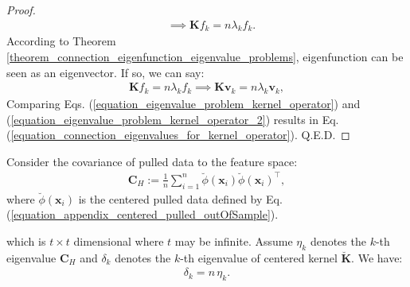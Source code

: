 \documentclass[lang=cn,10pt]{gorgeousnbook}
\numberwithin{equation}{section}%
\numberwithin{figure}{section}%
\begin{document}
\begin{proof}
\begin{align*}
&\implies \boldsymbol{K} f_k = n \lambda_k f_k.
\end{align*}
According to Theorem \ref{theorem_connection_eigenfunction_eigenvalue_problems}, eigenfunction can be seen as an eigenvector. If so, we can say:
\begin{align}\label{equation_eigenvalue_problem_kernel_operator_2}
\boldsymbol{K} f_k = n \lambda_k f_k \implies \boldsymbol{K} \boldsymbol{v}_k = n \lambda_k \boldsymbol{v}_k,
\end{align}
Comparing Eqs. (\ref{equation_eigenvalue_problem_kernel_operator}) and (\ref{equation_eigenvalue_problem_kernel_operator_2}) results in Eq. (\ref{equation_connection_eigenvalues_for_kernel_operator}). Q.E.D.
\end{proof}

\begin{lemma}
Consider the covariance of pulled data to the feature space:
\begin{align}\label{equation_covariance_in_feature_space}
\boldsymbol{C}_H := \frac{1}{n} \sum_{i=1}^n \breve{\phi}(\boldsymbol{x}_i) \breve{\phi}(\boldsymbol{x}_i)^\top,
\end{align}
where $\breve{\phi}(\boldsymbol{x}_i)$ is the centered pulled data defined by Eq. (\ref{equation_appendix_centered_pulled_outOfSample}).

which is $t \times t$ dimensional where $t$ may be infinite. 
Assume $\eta_k$ denotes the $k$-th eigenvalue $\boldsymbol{C}_H$ and $\delta_k$ denotes the $k$-th eigenvalue of centered kernel $\breve{\boldsymbol{K}}$. We have:
\begin{align}\label{equation_connection_eigenvalues_for_kernel_and_covariance}
\delta_k = n\, \eta_k.
\end{align}
\end{lemma}
\end{document}
